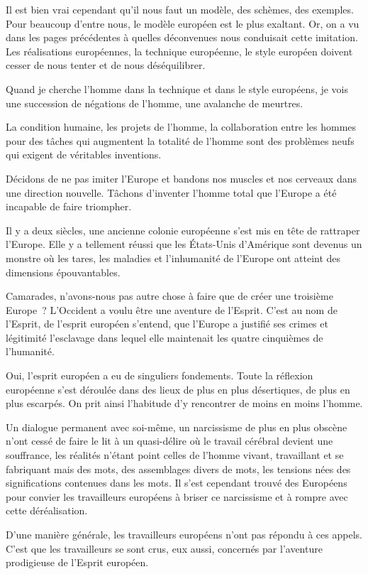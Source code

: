 \documentclass[french,twoside]{book} %
\begin{document}
Il est bien vrai cependant qu’il nous faut un modèle, des schèmes, des exemples. Pour beaucoup d’entre nous, le modèle européen est le plus exaltant. Or, on a vu dans les pages précédentes à quelles déconvenues nous conduisait cette imitation. Les réalisations européennes, la technique européenne, le style européen doivent cesser de nous tenter et de nous déséquilibrer.\par
Quand je cherche l’homme dans la technique et dans le style européens, je vois une succession de négations de l’homme, une avalanche de meurtres.\par
La condition humaine, les projets de l’homme, la collaboration entre les hommes pour des tâches qui augmentent la totalité de l’homme sont des problèmes neufs qui exigent de véritables inventions.\par
Décidons de ne pas imiter l’Europe et bandons nos muscles et nos cerveaux dans une direction nouvelle. Tâchons d’inventer l’homme total que l’Europe a été incapable de faire triompher.\par
Il y a deux siècles, une ancienne colonie européenne s’est mis en tête de rattraper l’Europe. Elle y a tellement réussi que les États-Unis d’Amérique sont devenus un monstre où les tares, les maladies et l’inhumanité de l’Europe ont atteint des dimensions épouvantables.\par
Camarades, n’avons-nous pas autre chose à faire que de créer une troisième Europe ? L’Occident a voulu être une aventure de l’Esprit. C’est au nom de l’Esprit, de l’esprit européen   s’entend, que l’Europe a justifié ses crimes et légitimité l’esclavage dans lequel elle maintenait les quatre cinquièmes de l’humanité.\par
Oui, l’esprit européen a eu de singuliers fondements. Toute la réflexion européenne s’est déroulée dans des lieux de plus en plus désertiques, de plus en plus escarpés. On prit ainsi l’habitude d’y rencontrer de moins en moins l’homme.\par
Un dialogue permanent avec soi-même, un narcissisme de plus en plus obscène n’ont cessé de faire le lit à un quasi-délire où le travail cérébral devient une souffrance, les réalités n’étant point celles de l’homme vivant, travaillant et se fabriquant mais des mots, des assemblages divers de mots, les tensions nées des significations contenues dans les mots. Il s’est cependant trouvé des Européens pour convier les travailleurs européens à briser ce narcissisme et à rompre avec cette déréalisation.\par
D’une manière générale, les travailleurs européens n’ont pas répondu à ces appels. C’est que les travailleurs se sont crus, eux aussi, concernés par l’aventure prodigieuse de l’Esprit européen.\par
\end{document}
